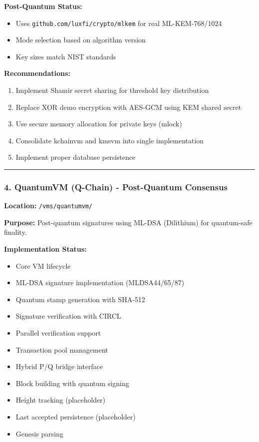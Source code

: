\documentclass[
]{article}
\providecommand{\tightlist}{%
  \setlength{\itemsep}{0pt}\setlength{\parskip}{0pt}}
\begin{document}
\textbf{Post-Quantum Status:}

\begin{itemize}
\tightlist
\item
  Uses \texttt{github.com/luxfi/crypto/mlkem} for real ML-KEM-768/1024
\item
  Mode selection based on algorithm version
\item
  Key sizes match NIST standards
\end{itemize}

\textbf{Recommendations:}

\begin{enumerate}
\def\labelenumi{\arabic{enumi}.}
\tightlist
\item
  Implement Shamir secret sharing for threshold key distribution
\item
  Replace XOR demo encryption with AES-GCM using KEM shared secret
\item
  Use secure memory allocation for private keys (mlock)
\item
  Consolidate kchainvm and kmsvm into single implementation
\item
  Implement proper database persistence
\end{enumerate}

\begin{center}\rule{0.5\linewidth}{0.5pt}\end{center}

\subsubsection{4. QuantumVM (Q-Chain) - Post-Quantum
Consensus}\label{4-quantumvm-q-chain---post-quantum-consensus}

\textbf{Location:} \texttt{/vms/quantumvm/}

\textbf{Purpose:} Post-quantum signatures using ML-DSA (Dilithium) for
quantum-safe finality.

\textbf{Implementation Status:}

\begin{itemize}
\tightlist
\item[$\boxtimes$]
  Core VM lifecycle
\item[$\boxtimes$]
  ML-DSA signature implementation (MLDSA44/65/87)
\item[$\boxtimes$]
  Quantum stamp generation with SHA-512
\item[$\boxtimes$]
  Signature verification with CIRCL
\item[$\boxtimes$]
  Parallel verification support
\item[$\boxtimes$]
  Transaction pool management
\item[$\boxtimes$]
  Hybrid P/Q bridge interface
\item[$\boxtimes$]
  Block building with quantum signing
\item[$\square$]
  Height tracking (placeholder)
\item[$\square$]
  Last accepted persistence (placeholder)
\item[$\square$]
  Genesis parsing
\end{itemize}
\end{document}

